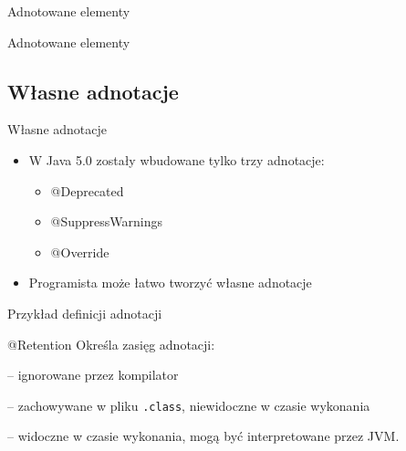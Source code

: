 \documentclass{beamer}
\begin{document}
\begin{frame}{Adnotowane elementy}
  
  \pause
  
\end{frame}

\begin{frame}{Adnotowane elementy}
  
  \pause
  
\end{frame}

\subsection{Własne adnotacje}

\begin{frame}{Własne adnotacje}
\begin{itemize}
\item W Java 5.0 zostały wbudowane tylko trzy adnotacje:
\begin{itemize}
\item \color{red} @Deprecated
\item \color{red} @SuppressWarnings
\item \color{red} @Override
\end{itemize}
\pause
\item Programista może łatwo tworzyć własne adnotacje
\end{itemize}
\end{frame}

\begin{frame}{Przykład definicji adnotacji}

\end{frame}

\begin{frame}{@Retention}
Określa zasięg adnotacji:
\begin{description}[RUNTIME]
\item<1->[SOURCE] -- ignorowane przez kompilator
\item<2->[CLASS] -- zachowywane w pliku \texttt{.class}, niewidoczne w czasie
  wykonania
\item<3->[RUNTIME] -- widoczne w czasie wykonania, mogą być interpretowane
  przez JVM.
\end{description}
\end{frame}
\end{document}
